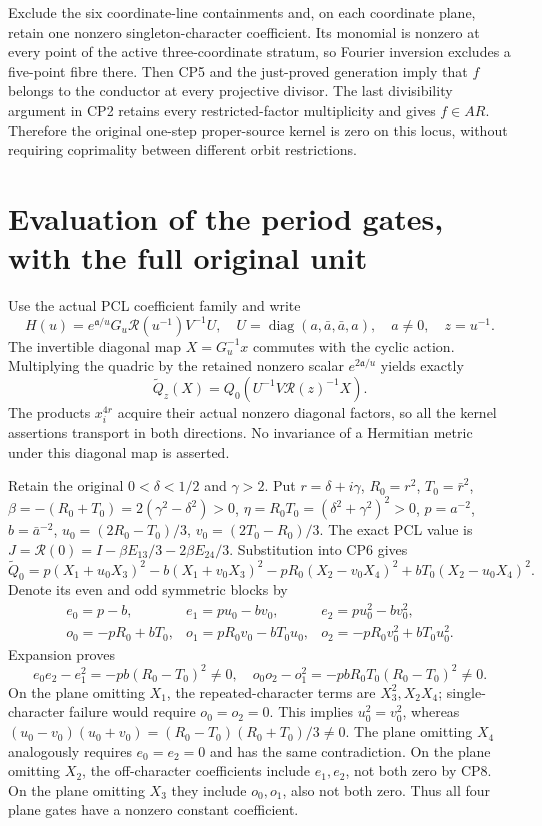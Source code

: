 \documentclass[11pt]{article}
\DeclareMathOperator{\diag}{diag}
\begin{document}
Exclude the six coordinate-line containments and, on each coordinate
plane, retain one nonzero singleton-character coefficient. Its monomial
is nonzero at every point of the active three-coordinate stratum, so
Fourier inversion excludes a five-point fibre there. Then CP5 and the just-proved
generation imply that $f$ belongs to the conductor at every
projective divisor. The last divisibility argument in CP2 retains
every restricted-factor multiplicity and gives $f\in AR$. Therefore
the original one-step proper-source kernel is zero on this locus,
without requiring coprimality between different orbit restrictions.

\section{Evaluation of the period gates, with the full original unit}
Use the actual PCL coefficient family \cite{PCL} and write
\[
 H(u)=e^{\mathfrak a/u}G_u\mathcal R(u^{-1})V^{-1}U,
 \quad U=\diag(a,\bar a,\bar a,a),\quad a\ne0,\quad z=u^{-1}.
\]
The invertible diagonal map $X=G_u^{-1}x$ commutes with the cyclic
action. Multiplying the quadric by the retained nonzero scalar
$e^{2\mathfrak a/u}$ yields exactly
\[
 \widetilde Q_z(X)=Q_0(U^{-1}V\mathcal R(z)^{-1}X).                 \tag{CP6}
\]
The products $x_i^{4r}$ acquire their actual nonzero diagonal
factors, so all the kernel assertions transport in both directions.
No invariance of a Hermitian metric under this diagonal map is asserted.

Retain the original $0<\delta<1/2$ and $\gamma>2$.
Put $r=\delta+i\gamma$, $R_0=r^2$, $T_0=\bar r^2$,
$\beta=-(R_0+T_0)=2(\gamma^2-\delta^2)>0$,
$\eta=R_0T_0=(\delta^2+\gamma^2)^2>0$, $p=a^{-2}$,
$b=\bar a^{-2}$, $u_0=(2R_0-T_0)/3$, $v_0=(2T_0-R_0)/3$.
The exact PCL value is $J=\mathcal R(0)=I-\beta E_{13}/3-2\beta E_{24}/3$.
Substitution into CP6 gives
\[
 \widetilde Q_0=p(X_1+u_0X_3)^2-b(X_1+v_0X_3)^2
       -pR_0(X_2-v_0X_4)^2+bT_0(X_2-u_0X_4)^2.                    \tag{CP7}
\]
Denote its even and odd symmetric blocks by
\[
 \begin{array}{lll}
 e_0=p-b,&e_1=pu_0-bv_0,&e_2=pu_0^2-bv_0^2,\\
 o_0=-pR_0+bT_0,&o_1=pR_0v_0-bT_0u_0,
     &o_2=-pR_0v_0^2+bT_0u_0^2.
 \end{array}
\]
Expansion proves
\[
 e_0e_2-e_1^2=-pb(R_0-T_0)^2\ne0,\quad
 o_0o_2-o_1^2=-pbR_0T_0(R_0-T_0)^2\ne0.                           \tag{CP8}
\]
On the plane omitting $X_1$, the repeated-character terms are
$X_3^2,X_2X_4$; single-character failure would require $o_0=o_2=0$.
This implies $u_0^2=v_0^2$, whereas
$(u_0-v_0)(u_0+v_0)=(R_0-T_0)(R_0+T_0)/3\ne0$.
The plane omitting $X_4$ analogously requires $e_0=e_2=0$ and
has the same contradiction. On the plane omitting $X_2$, the
off-character coefficients include $e_1,e_2$, not both zero by
CP8. On the plane omitting $X_3$ they include $o_0,o_1$, also
not both zero. Thus all four plane gates have a nonzero constant
coefficient.
\end{document}
